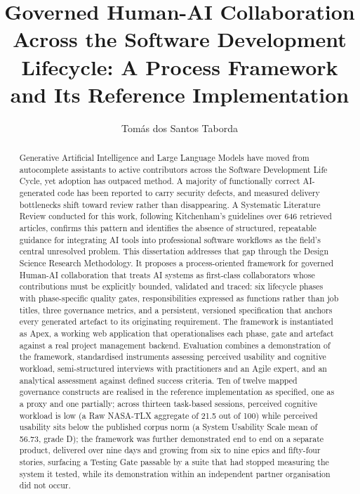 \documentclass[sigconf,review=false]{acmart}
\begin{document}
\title{Governed Human-AI Collaboration Across the Software Development Lifecycle: A Process Framework and Its Reference Implementation}
\renewcommand{\shorttitle}{Governed Human-AI Collaboration Across the SDLC}

\author{Tomás dos Santos Taborda}

\renewcommand{\shortauthors}{Taborda, Mira da Silva, and de Sousa}

\begin{abstract}
Generative Artificial Intelligence and Large Language Models have moved from autocomplete assistants to active contributors across the Software Development Life Cycle, yet adoption has outpaced method. A majority of functionally correct AI-generated code has been reported to carry security defects, and measured delivery bottlenecks shift toward review rather than disappearing. A Systematic Literature Review conducted for this work, following Kitchenham's guidelines over 646 retrieved articles, confirms this pattern and identifies the absence of structured, repeatable guidance for integrating AI tools into professional software workflows as the field's central unresolved problem. This dissertation addresses that gap through the Design Science Research Methodology. It proposes a process-oriented framework for governed Human-AI collaboration that treats AI systems as first-class collaborators whose contributions must be explicitly bounded, validated and traced: six lifecycle phases with phase-specific quality gates, responsibilities expressed as functions rather than job titles, three governance metrics, and a persistent, versioned specification that anchors every generated artefact to its originating requirement. The framework is instantiated as Apex, a working web application that operationalises each phase, gate and artefact against a real project management backend. Evaluation combines a demonstration of the framework, standardised instruments assessing perceived usability and cognitive workload, semi-structured interviews with practitioners and an Agile expert, and an analytical assessment against defined success criteria. Ten of twelve mapped governance constructs are realised in the reference implementation as specified, one as a proxy and one partially; across thirteen task-based sessions, perceived cognitive workload is low (a Raw NASA-TLX aggregate of 21.5 out of 100) while perceived usability sits below the published corpus norm (a System Usability Scale mean of 56.73, grade D); the framework was further demonstrated end to end on a separate product, delivered over nine days and growing from six to nine epics and fifty-four stories, surfacing a Testing Gate passable by a suite that had stopped measuring the system it tested, while its demonstration within an independent partner organisation did not occur.
\end{abstract}
\end{document}
